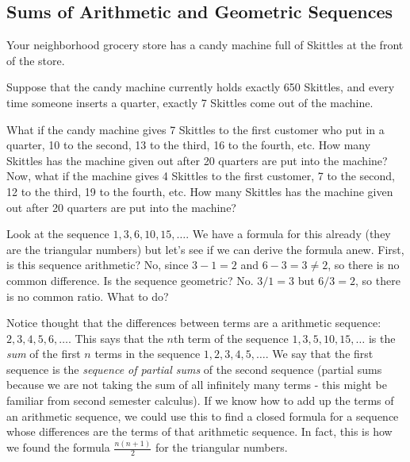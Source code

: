 \documentclass[12pt]{article}
\begin{document}
\subsection{Sums of Arithmetic and Geometric Sequences}

\begin{activity}
Your neighborhood grocery store has a candy machine full of Skittles at the front of the store.
\begin{questions}
\question Suppose that the candy machine currently holds exactly 650 Skittles, and every time someone inserts a quarter, exactly 7 Skittles come out of the machine. 
\question What if the candy machine gives 7 Skittles to the first customer who put in a quarter, 10 to the second, 13 to the third, 16 to the fourth, etc. How many Skittles has the machine given out after 20 quarters are put into the machine?
\question Now, what if the machine gives 4 Skittles to the first customer, 7 to the second, 12 to the third, 19 to the fourth, etc. How many Skittles has the machine given out after 20 quarters are put into the machine?
\end{questions}
\end{activity}



Look at the sequence $1, 3, 6, 10, 15,\ldots$.  We have a formula for this already (they are the triangular numbers) but let's see if we can derive the formula anew.  First, is this sequence arithmetic?  No, since $3-1 = 2$ and $6-3 = 3 \ne 2$, so there is no common difference.  Is the sequence geometric?  No.  $3/1 = 3$ but $6/3 = 2$, so there is no common ratio.  What to do?  

Notice thought that the differences between terms are a arithmetic sequence: $2, 3, 4, 5, 6,\ldots$.  This says that the $n$th term of the sequence $1,3,5,10,15,\ldots$ is the {\em sum} of the first $n$ terms in the sequence $1,2,3,4,5,\ldots$.  We say that the first sequence is the {\em sequence of partial sums} of the second sequence (partial sums because we are not taking the sum of all infinitely many terms - this might be familiar from second semester calculus). If we know how to add up the terms of an arithmetic sequence, we could use this to find a closed formula for a sequence whose differences are the terms of that arithmetic sequence.  In fact, this is how we found the formula $\frac{n(n+1)}{2}$ for the triangular numbers.
\end{document}

